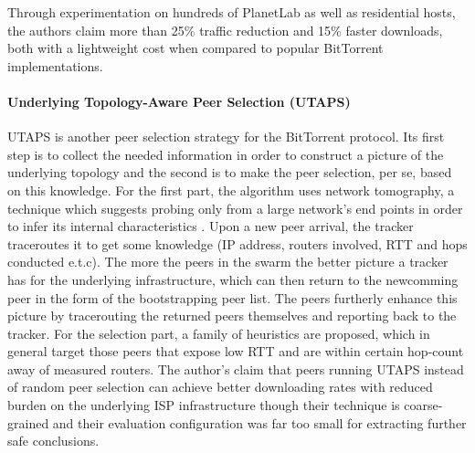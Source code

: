 
Through experimentation on hundreds of PlanetLab as well as residential hosts,
the authors claim more than 25\% traffic reduction and 15\% faster downloads,
both with a lightweight cost when compared to popular BitTorrent
implementations.

\paragraph*{\bf Underlying Topology-Aware Peer Selection (UTAPS)}
UTAPS \cite{lcy_utaps_2008} is another peer selection strategy for the
BitTorrent protocol. Its first step is to collect the needed information in
order to construct a picture of the underlying topology and the second is to
make the peer selection, per se, based on this knowledge. For the first part,
the algorithm uses network tomography, a technique which suggests probing only
from a large network's end points in order to infer its internal characteristics
\cite{chny_tomography_2002}. Upon a new peer arrival, the tracker traceroutes it
to get some knowledge (IP address, routers involved, RTT and hops conducted
e.t.c). The more the peers in the swarm the better picture a tracker has for the
underlying infrastructure, which can then return to the newcomming peer in the
form of the bootstrapping peer list. The peers furtherly enhance this picture by
tracerouting the returned peers themselves and reporting back to the tracker.
For the selection part, a family of heuristics are proposed, which in general
target those peers that expose low RTT and are within certain hop-count away of
measured routers. The author's claim that peers running UTAPS instead of random
peer selection can achieve better downloading rates with reduced burden on the
underlying ISP infrastructure though their technique is coarse-grained and their
evaluation configuration was far too small for extracting further safe
conclusions.

